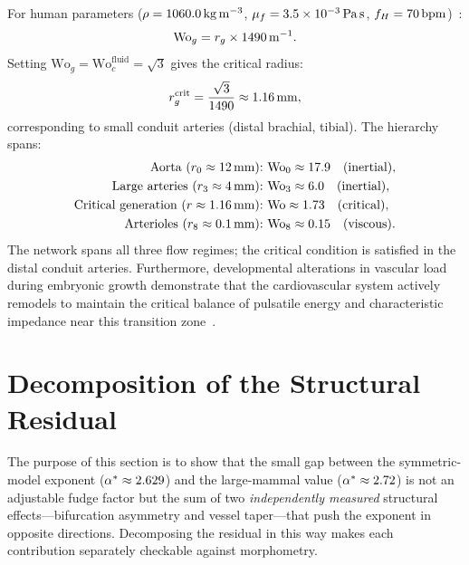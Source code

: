 \documentclass[11pt,a4paper]{article}
\theoremstyle{remark}
\begin{document}
For human parameters ($\rho = 1060.0\,\mathrm{kg\,m^{-3}}$, $\mu_f =
3.5\times10^{-3}\,\mathrm{Pa\,s}$, $f_H =
70\,\mathrm{bpm}$)~\cite{huo2012}:
\begin{equation}
    \mathrm{Wo}_g = r_g \times 1490\,\mathrm{m^{-1}}.
\end{equation}
Setting $\mathrm{Wo}_g = \mathrm{Wo}_c^{\mathrm{fluid}} = \sqrt{3}$ gives the
critical radius:
\begin{equation}
    r_g^{\mathrm{crit}} = \frac{\sqrt{3}}{1490} \approx 1.16\,\mathrm{mm},
\end{equation}
corresponding to small conduit arteries (distal brachial, tibial). The hierarchy
spans:
\begin{align}
    \text{Aorta ($r_0 \approx 12$\,mm):}\ &\mathrm{Wo}_0\approx17.9\quad (\text{inertial}), \\
    \text{Large arteries ($r_3 \approx 4$\,mm):}\ &\mathrm{Wo}_3\approx6.0\quad (\text{inertial}), \\
    \text{Critical generation ($r \approx \VarRadiusCritMm$\,mm):}\ &\mathrm{Wo}\approx1.73\quad (\text{critical}), \\
    \text{Arterioles ($r_8 \approx 0.1$\,mm):}\ &\mathrm{Wo}_8\approx0.15\quad (\text{viscous}).
\end{align}
The network spans all three flow regimes; the critical condition is satisfied in
the distal conduit arteries. Furthermore, developmental alterations in vascular
load during embryonic growth demonstrate that the cardiovascular system actively
remodels to maintain the critical balance of pulsatile energy and characteristic
impedance near this transition zone~\cite{lucitti2005}.


\section{Decomposition of the Structural Residual}
\label{sec:S3}

The purpose of this section is to show that the small gap between the
symmetric-model exponent ($\alpha^*\approx2.629$) and the
large-mammal value ($\alpha^*\approx2.72$) is not an adjustable fudge
factor but the sum of two \emph{independently measured} structural
effects---bifurcation asymmetry and vessel taper---that push the exponent in
opposite directions. Decomposing the residual in this way makes each
contribution separately checkable against morphometry.
\end{document}
